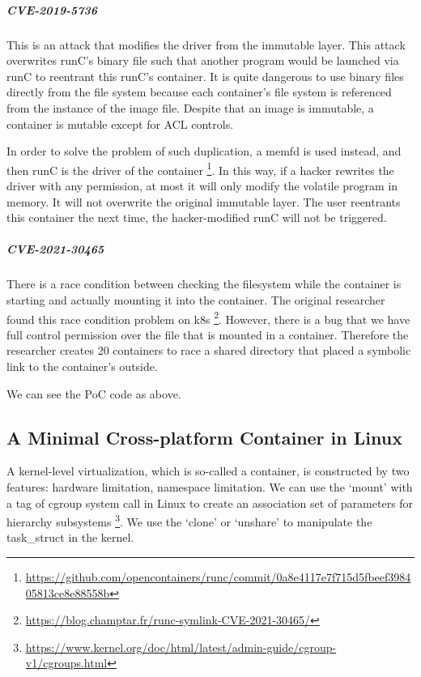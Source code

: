 \subparagraph{CVE-2019-5736}
This is an attack that modifies the driver from the immutable layer. This attack
overwrites runC's binary file such that another program would be launched via runC to
reentrant this runC's container. It is quite dangerous to use binary files directly
from the file system because each container's file system is referenced from the instance
of the image file. Despite that an image is immutable, a container is mutable except for ACL controls.

In order to solve the problem of such duplication, a memfd is used instead, and
then runC is the driver of the container \footnote{\url{https://github.com/opencontainers/runc/commit/0a8e4117e7f715d5fbeef398405813ce8e88558b}}.
In this way, if a hacker rewrites the driver with any permission, at most it will only modify
the volatile program in memory. It will not overwrite the original immutable layer.
The user reentrants this container the next time, the hacker-modified runC will
not be triggered.

\subparagraph{CVE-2021-30465}
There is a race condition between checking the filesystem while the container is
starting and actually mounting it into the container. The original researcher found
this race condition problem on k8s \footnote{\url{https://blog.champtar.fr/runc-symlink-CVE-2021-30465/}}.
However, there is a bug that we have full control permission over the file that
is mounted in a container. Therefore the researcher creates 20 containers to race a shared
directory that placed a symbolic link to the container's outside.



We can see the PoC code as above.

\subsection{A Minimal Cross-platform Container in Linux}
A kernel-level virtualization, which is so-called a container, is constructed by two
features: hardware limitation, namespace limitation. We can use the `mount' with a tag of
cgroup system call in Linux to create an association set of parameters for hierarchy
subsystems \footnote{\url{https://www.kernel.org/doc/html/latest/admin-guide/cgroup-v1/cgroups.html}}.
We use the `clone' or `unshare' to manipulate the task\_struct in the kernel.

